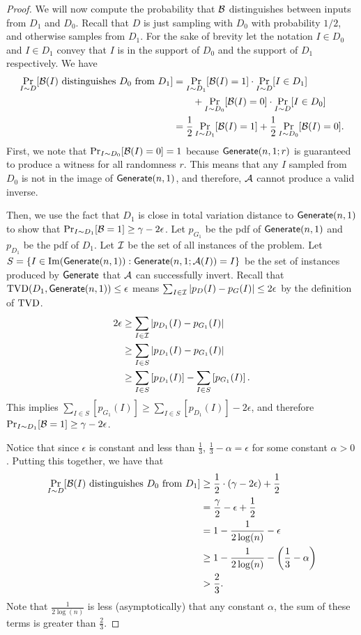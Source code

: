 \begin{proof}
	
	We will now compute the probability that ${\cal B}$ distinguishes between inputs from $D_1$ and $D_0$. Recall that $D$ is just sampling with $D_0$ with probability $1/2$, and otherwise samples from $D_1$. For the sake of brevity let the notation $I \in D_0$ and $I\in D_1$ convey that $I$ is in the support of $D_0$ and the support of $D_1$ respectively. We have
	\begin{align*}
	\Pr_{I \sim D}[{\cal B}(I)\mbox{ distinguishes }D_0\text{ from }D_1] &= \Pr_{I \sim D_1}[{\cal B}(I) = 1] \cdot \Pr_{I \sim D}[I \in D_1] \\
	&\qquad + \Pr_{I \sim D_0}[{\cal B}(I) = 0]\cdot \Pr_{I \sim D}[I \in D_0]\\
	&= \frac 1 2 \Pr_{I \sim D_1}[{\cal B}(I) = 1] + \frac 1 2 \Pr_{I \sim D_0}[{\cal B}(I) = 0].
	\end{align*}
	First, we note that $\Pr_{I \sim D_0}[{\cal B}(I) = 0] = 1$ because $\mathsf{Generate}(n,1; r)$ is guaranteed to produce a witness for all randomness $r$. This means that any $I$ sampled from $D_0$ is not in the image of $\mathsf{Generate}(n,1)$, and therefore, $\mathcal{A}$ cannot produce a valid inverse.
	
	Then, we use the fact that $D_1$ is close in total variation distance to $\mathsf{Generate}(n,1)$ to show that $\Pr_{I \sim D_1}[{\cal B} = 1] \ge \gamma - 2\epsilon$. Let $p_{G_1}$ be the pdf of $\mathsf{Generate}(n,1)$ and $p_{D_1}$ be the pdf of $D_1$. Let ${\cal I}$ be the set of all instances of the problem. Let $S = \{I \in \mathrm{Im}(\mathsf{Generate}(n,1)) : \mathsf{Generate}(n,1;\mathcal{A}(I)) = I \}$ be the set of instances produced by $\mathsf{Generate}$ that $\mathcal{A}$ can successfully invert. Recall that $\mathrm{TVD}(D_1, \mathsf{Generate}(n,1)) \leq \epsilon$ means $\sum_{I \in {\cal I}} \vert p_D(I) - p_G(I) \vert \leq 2 \epsilon$ by the definition of $\mathrm{TVD}$.
	\begin{align*}
	2\epsilon &\ge \sum_{I \in {\cal I}} \vert p_{D_1}(I) - p_{G_1}(I) \vert\\
	&\ge \sum_{I \in S} \vert p_{D_1}(I) - p_{G_1}(I) \vert \\
	&\ge \sum_{I \in S} \left[p_{D_1}(I) \right] - \sum_{I \in S} \left[p_{G_1}(I) \right].
	\end{align*}
	This implies $ \sum_{I \in S} \left[p_{G_1}(I) \right] \ge \sum_{I \in S} \left[p_{D_1}(I) \right] - 2\epsilon$, and therefore $\Pr_{I \sim D_1}[{\cal B} = 1] \ge \gamma - 2\epsilon$.
	
		
    Notice that since $\epsilon$ is constant and less than $\frac 1 3$, $\frac 1 3 - \alpha = \epsilon$ for some constant $\alpha>0$.
	Putting this together, we have that
	\begin{align*}
	\Pr_{I \sim D}[{\cal B}(I)\mbox{ distinguishes }D_0\text{ from }D_1] &\ge \frac 1 2 \cdot (\gamma - 2\epsilon) + \frac 1 2\\
	&= \frac \gamma 2 - \epsilon + \frac 1 2\\
	&= 1 - \frac{1}{2\log(n)} - \epsilon\\
	&\ge 1 - \frac{1}{2\log(n)} - \left(\frac 1 3 - \alpha \right)\\
	&> \frac 2 3.
	\end{align*}
 Note that $\frac 1 {2\log(n)}$ is less (asymptotically) that any constant $\alpha$, the sum of these terms is greater than $\frac 2 3$.
	

\end{proof}
